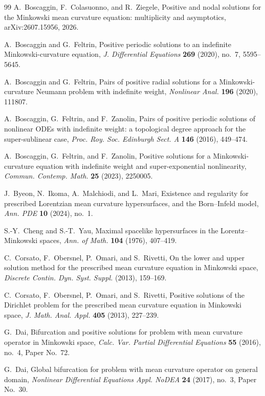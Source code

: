 \documentclass[11pt,reqno]{amsart}
\theoremstyle{plain}
\theoremstyle{definition}
\numberwithin{equation}{section}
\begin{document}
\begin{thebibliography}{99}
A.~Boscaggin, F.~Colasuonno, and R.~Ziegele,
Positive and nodal solutions for the Minkowski mean curvature equation: multiplicity and asymptotics,
arXiv:2607.15956, 2026.

A.~Boscaggin and G.~Feltrin,
Positive periodic solutions to an indefinite Minkowski-curvature equation,
\emph{J. Differential Equations} \textbf{269} (2020), no.~7, 5595--5645.

A.~Boscaggin and G.~Feltrin,
Pairs of positive radial solutions for a Minkowski-curvature Neumann problem with indefinite weight,
\emph{Nonlinear Anal.} \textbf{196} (2020), 111807.

A.~Boscaggin, G.~Feltrin, and F.~Zanolin,
Pairs of positive periodic solutions of nonlinear ODEs with indefinite weight: a topological degree approach for the super-sublinear case,
\emph{Proc. Roy. Soc. Edinburgh Sect. A} \textbf{146} (2016), 449--474.

A.~Boscaggin, G.~Feltrin, and F.~Zanolin,
Positive solutions for a Minkowski-curvature equation with indefinite weight and super-exponential nonlinearity,
\emph{Commun. Contemp. Math.} \textbf{25} (2023), 2250005.

J.~Byeon, N.~Ikoma, A.~Malchiodi, and L.~Mari,
Existence and regularity for prescribed Lorentzian mean curvature hypersurfaces, and the Born--Infeld model,
\emph{Ann. PDE} \textbf{10} (2024), no.~1.

S.-Y.~Cheng and S.-T.~Yau,
Maximal spacelike hypersurfaces in the Lorentz--Minkowski spaces,
\emph{Ann. of Math.} \textbf{104} (1976), 407--419.

C.~Corsato, F.~Obersnel, P.~Omari, and S.~Rivetti,
On the lower and upper solution method for the prescribed mean curvature equation in Minkowski space,
\emph{Discrete Contin. Dyn. Syst. Suppl.} (2013), 159--169.

C.~Corsato, F.~Obersnel, P.~Omari, and S.~Rivetti,
Positive solutions of the Dirichlet problem for the prescribed mean curvature equation in Minkowski space,
\emph{J. Math. Anal. Appl.} \textbf{405} (2013), 227--239.

G.~Dai,
Bifurcation and positive solutions for problem with mean curvature operator in Minkowski space,
\emph{Calc. Var. Partial Differential Equations} \textbf{55} (2016), no.~4, Paper No.~72.

G.~Dai,
Global bifurcation for problem with mean curvature operator on general domain,
\emph{Nonlinear Differential Equations Appl. NoDEA} \textbf{24} (2017), no.~3, Paper No.~30.


\end{thebibliography}
\end{document}

